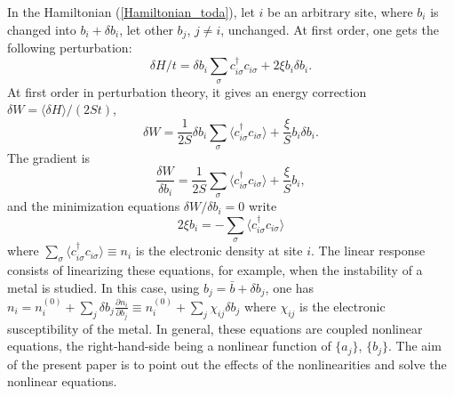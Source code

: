 \documentclass[]{revtex4-1}
\begin{document}
In the Hamiltonian (\ref{Hamiltonian_toda}), let $i$ be an arbitrary site, where $b_i$ is changed into $b_i+\delta b_i$, let other $b_j$, $j \neq i$, unchanged. At first order, one gets the following perturbation:
\begin{equation}
\delta H/t=  \delta b_i \sum_{\sigma} c_{i \sigma}^{\dagger} c_{i\sigma} + 2 \xi b_i \delta b_i.
\end{equation}
At first order in perturbation theory, it gives an energy correction $\delta W=\langle \delta H \rangle/(2St)$,
\begin{equation}
\delta W=  \frac{1}{2S} \delta b_i \sum_{\sigma} \langle  c_{i \sigma}^{\dagger} c_{i\sigma} \rangle + \frac{\xi}{S} b_i \delta b_i.
\end{equation}
The gradient is 
\begin{equation}
\frac{\delta W}{\delta b_i}=   \frac{1}{2S} \sum_{\sigma} \langle  c_{i \sigma}^{\dagger} c_{i\sigma} \rangle + \frac{\xi}{S} b_i,
\label{firstgradient} \end{equation}
and the minimization equations $\delta W/\delta b_i=0$ write
\begin{equation}
2 \xi b_i =   - \sum_{\sigma} \langle  c_{i \sigma}^{\dagger} c_{i\sigma} \rangle \label{eqnonlin0}
\end{equation}
where $\sum_{\sigma} \langle  c_{i \sigma}^{\dagger} c_{i\sigma} \rangle \equiv n_i$ is the electronic density at site $i$.  The linear response consists of linearizing these equations, for example, when the instability of a metal is studied. In this case, using $b_j=\bar{b}+\delta b_j$, one has $n_i=n_i^{(0)}+ \sum_j \delta b_j \frac{\partial n_i}{\partial b_j} \equiv n_i^{(0)}+ \sum_j \chi_{ij} \delta b_j$ where $\chi_{ij}$ is the electronic susceptibility of the metal. In general, these equations are coupled nonlinear equations, the right-hand-side being a nonlinear function of $\{a_j\}$, $\{b_j\}$. The aim of the present paper is to point out the effects of the nonlinearities and solve the nonlinear equations.
\end{document}
